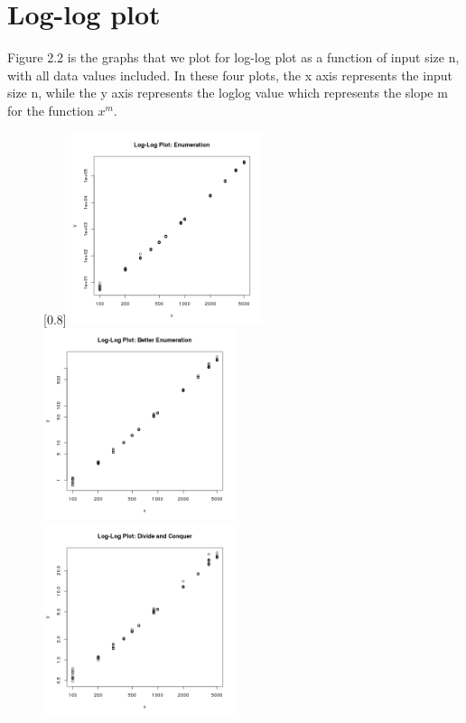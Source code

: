 \documentclass[11pt]{scrreprt}
\begin{document}
\section{Log-log plot}

Figure 2.2 is the graphs that we plot for log-log plot as a function of input size n, with all data values included. In these four plots, the x axis represents the input size n, while the y axis represents the loglog value which represents the slope m for the function $x^m$.

\begin{figure}[!htbp]
	\captionsetup{singlelinecheck=off}
	\captionsetup[subfigure]{singlelinecheck=on}
	[0.8\textwidth]{%
		\includegraphics[width=0.50\textwidth]{loglog_enumeration.png}%
		\includegraphics[width=0.50\textwidth]{loglog_better_enumeration.png}
		\includegraphics[width=0.50\textwidth]{loglog_divide_n_conquer.png}%
}
\end{figure}
\end{document}
